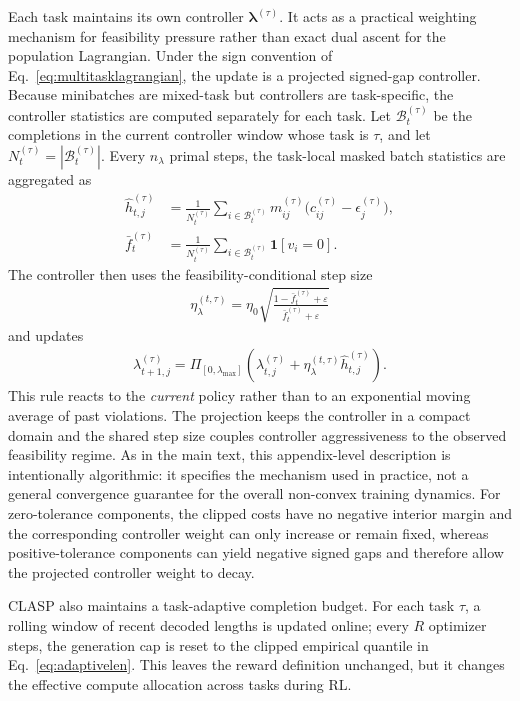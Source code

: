 \documentclass{article}
\theoremstyle{remark}
\begin{document}
Each task maintains its own controller \(\boldsymbol{\lambda}^{(\tau)}\). It acts as a practical weighting mechanism for feasibility pressure rather than exact dual ascent for the population Lagrangian. Under the sign convention of Eq.~\eqref{eq:multitasklagrangian}, the update is a projected signed-gap controller. Because minibatches are mixed-task but controllers are task-specific, the controller statistics are computed separately for each task. Let \(\mathcal B_t^{(\tau)}\) be the completions in the current controller window whose task is \(\tau\), and let \(N_t^{(\tau)}=|\mathcal B_t^{(\tau)}|\). Every \(n_\lambda\) primal steps, the task-local masked batch statistics are aggregated as
\begin{align}
\hat h_{t,j}^{(\tau)}
&=
\frac{1}{N_t^{(\tau)}} \sum_{i\in\mathcal B_t^{(\tau)}}
m_{ij}^{(\tau)} \bigl(c_{ij}^{(\tau)}-\epsilon_j^{(\tau)}\bigr), \\
\bar f_t^{(\tau)}
&=
\frac{1}{N_t^{(\tau)}} \sum_{i\in\mathcal B_t^{(\tau)}} \mathbf{1}[v_i = 0].
\end{align}
The controller then uses the feasibility-conditional step size
\begin{align}
\eta_\lambda^{(t,\tau)} = \eta_0 \sqrt{\frac{1-\bar f_t^{(\tau)}+\varepsilon}{\bar f_t^{(\tau)}+\varepsilon}}
\end{align}
and updates
\begin{align}
\lambda_{t+1,j}^{(\tau)}
=
\Pi_{[0,\lambda_{\max}]}
\left(
\lambda_{t,j}^{(\tau)} + \eta_\lambda^{(t,\tau)} \hat h_{t,j}^{(\tau)}
\right).
\label{eq:claspdual}
\end{align}
This rule reacts to the \emph{current} policy rather than to an exponential moving average of past violations. The projection keeps the controller in a compact domain and the shared step size couples controller aggressiveness to the observed feasibility regime. As in the main text, this appendix-level description is intentionally algorithmic: it specifies the mechanism used in practice, not a general convergence guarantee for the overall non-convex training dynamics.
For zero-tolerance components, the clipped costs have no negative interior margin and the corresponding controller weight can only increase or remain fixed, whereas positive-tolerance components can yield negative signed gaps and therefore allow the projected controller weight to decay.

CLASP also maintains a task-adaptive completion budget. For each task \(\tau\), a rolling window of recent decoded lengths is updated online; every \(R\) optimizer steps, the generation cap is reset to the clipped empirical quantile in Eq.~\eqref{eq:adaptivelen}. This leaves the reward definition unchanged, but it changes the effective compute allocation across tasks during RL.
\end{document}

